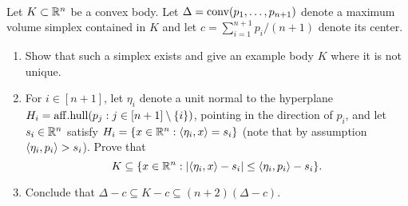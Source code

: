 \begin{exercise}~\\
Let $K \subset \mathbb{R}^n$ be a convex body. Let $\Delta = {\rm
conv}(p_1,\dots,p_{n+1})$ denote a maximum volume simplex contained in $K$ and
let $c = \sum_{i=1}^{n+1} p_i/(n+1)$ denote its center.
\begin{enumerate}
\item Show that such a simplex exists and give an example body $K$ where it is
not unique.
\item For $i \in [n+1]$, let $\eta_i$ denote a unit normal to the hyperplane
$H_i = {\rm aff.hull}(p_j: j \in [n+1] \setminus \{{i}\})$, pointing in the
direction of $p_i$, and let $s_i \in \mathbb{R}^n$ satisfy $H_i = \{x \in \mathbb{R}^n:
\langle{\eta_i, x}\rangle = s_i\}$ (note that by assumption $\langle{\eta_i, p_i}\rangle > s_i$).
Prove that
\[
K \subseteq \{{x \in \mathbb{R}^n: |\langle{\eta_i, x}\rangle-s_i| \leq \langle{\eta_i, p_i}\rangle-s_i}\}.
\]
\item Conclude that $\Delta-c \subseteq K-c \subseteq (n+2)(\Delta-c)$.
\end{enumerate}
\end{exercise}

